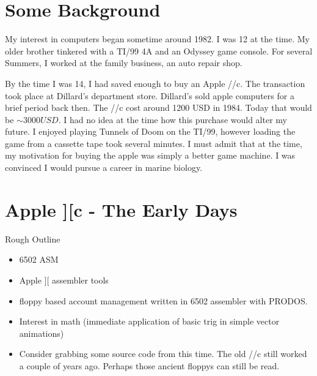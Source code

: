
\section{Some  Background}
My interest in computers began sometime around 1982. I was 12 at the
time. My older brother tinkered with a TI/99 4A and an Odyssey game
console. For several Summers, I worked at the family business, an auto
repair shop. 

By the time I was 14, I had saved enough to buy an Apple
//c. The transaction took place at Dillard's department store. Dillard's
sold apple computers for a brief period back then. The //c
cost around 1200 USD in 1984. Today that would be ${\sim} 3000 USD$.
I had no idea at the time how this purchase would alter my future.
I enjoyed playing Tunnels of Doom on the TI/99, however loading the 
game from a cassette tape took several minutes. I must admit that at
the time, my motivation for buying the apple was simply a better game
machine. I was convinced I would pursue a career in marine 
biology. 


\section{Apple ][c - The Early Days}
	Rough Outline
	\begin{itemize}
	\item 6502 ASM
	\item Apple ][ assembler tools
	\item floppy based account management written in 6502 assembler with PRODOS.
	\item Interest in math (immediate application of basic trig in simple vector animations)
	\item Consider grabbing some source code from this time. The old //c still worked a couple of years ago. Perhaps those ancient floppys can still be read.
	\end{itemize}
